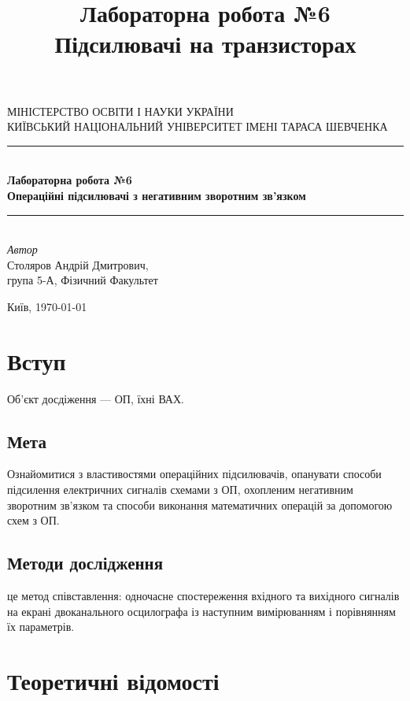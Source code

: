 \documentclass[
  ukrainian,
  14pt
]{extreport}
\author{}
\title{\Huge Лабораторна робота №6 \\\Large Підсилювачі на транзисторах}
\date{}
\begin{document}
\begin{titlepage} 
	\newcommand{\HRule}{\rule{\linewidth}{0.5mm}} 
	
	\center 
	
	\textsc{\Large МІНІСТЕРСТВО ОСВІТИ І НАУКИ УКРАЇНИ\\ \Large КИЇВСЬКИЙ НАЦІОНАЛЬНИЙ УНІВЕРСИТЕТ ІМЕНІ ТАРАСА ШЕВЧЕНКА}\\[1.5cm] 

	
	\HRule\\[0.4cm]
	
	{\huge \bfseries  Лабораторна робота №6 \\\Large \bfseries 
    Операційні підсилювачі з негативним зворотним зв'язком
    }\\[0.4cm]
	
	\HRule\\[1.5cm]

	
	

	{\large\textit{Автор}}\\
	\large Столяров Андрій Дмитрович, \\\large група 5-А, Фізичний Факультет 
	
	
	\vfill\vfill\vfill 
	\vfill
	{\normalsize Київ, \today} 
\end{titlepage}
\tableofcontents
\clearpage
\section{Вступ}
Об'єкт досдіження — ОП, їхні ВАХ.

\subsection{Мета}
Ознайомитися з властивостями операційних
підсилювачів, опанувати способи підсилення електричних сигналів схемами з
ОП, охопленим негативним зворотним зв'язком та способи виконання
математичних операцій за допомогою схем з ОП.

\subsection{Методи дослідження}
це метод співставлення: одночасне спостереження вхідного та вихідного
сигналів на екрані двоканального осцилографа із наступним вимірюванням і
порівнянням їх параметрів.


\section{Теоретичні відомості}
\end{document}
